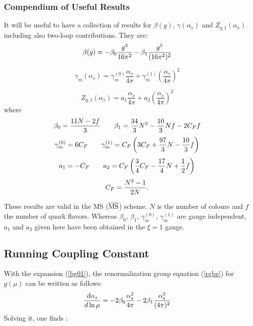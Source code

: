 \documentclass[12pt,rotate]{article}
\def\as{\alpha_s}
\newcommand{\be}{\begin{equation}}
\newcommand{\ee}{\end{equation}}
\def\aspi{\frac{\as}{4\pi}}
\begin{document}
\begin{itemize}
\subsubsection{Compendium of Useful Results}
It will be useful to have a collection of results for $\beta(g)$, 
$\gamma(\alpha_s)$ and $Z_{q,1}(\alpha_s)$ including also 
two-loop contributions.
They are:
\begin{equation}\label{bg01}
\beta(g)=-\beta_0{g^3\over 16\pi^2}-\beta_1{g^5\over (16\pi^2)^2}
  \end{equation}

\begin{equation}\label{gama}
\gamma_m(\as)=\gamma^{(0)}_{m}\aspi + \gamma^{(1)}_{m}\left(\aspi\right)^2
\end{equation}

\begin{equation}\label{zq1a} 
Z_{q, 1}(\as)=a_1\aspi + a_2\left(\aspi\right)^2
\end{equation}
where
\begin{equation}\label{b0b1}
\beta_0={{11N-2f}\over 3}\qquad
\beta_1={34\over 3}N^2-{10\over 3}Nf-2C_F f
\ee
\begin{equation}\label{gm01} \gamma^{(0)}_{m}
=6C_F\qquad \gamma^{(1)}_{m}=C_F\left(
     3C_F+{97\over 3}N-{10\over 3}f\right)  \end{equation}
\begin{equation}\label{a1a2} a_1=-C_F\qquad a_2=C_F\left(
     {3\over 4}C_F-{17\over 4}N+{1\over 2}f\right)  
\end{equation}
\be
C_F={{N^2-1}\over{2N}}.
\end{equation}

These results are valid in the MS ($\overline{\rm MS}$) scheme.
$N$ is the number of colours and $f$ the number of quark flavors.
Whereas $\beta_0$, $\beta_1$, $\gamma_m^{(0)}$, $\gamma_m^{(1)}$
are gauge independent, $a_1$ and $a_2$ given here have been obtained
in the $\xi=1$ gauge.


\subsection{Running Coupling Constant}
With the expansion (\ref{bg01}), the renormalization group equation 
(\ref{rgbe}) for $g(\mu)$ can be written as follows:
\begin{equation}\label{rga}
{d\as\over d\ln\mu}=-2\beta_0 {\as^2\over 4\pi}-2\beta_1
  {\as^3\over(4\pi)^2}  \end{equation}
Solving it, one finds \cite{BBDM}:


\end{itemize}
\end{document}
